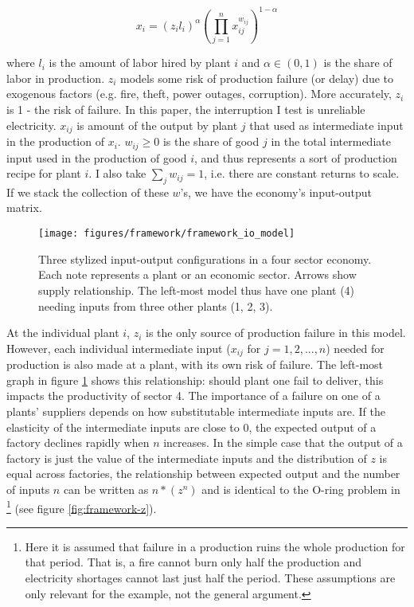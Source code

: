 \documentclass[11pt]{article}
\begin{document}
\[
x_i =  (z_i l_i)^{\alpha}(\prod^{n}_{j = 1} x_{ij}^{w_{ij}})^{1 - \alpha}
\]

where \(l_i\) is the amount of labor hired by plant \(i\) and \(\alpha \in (0, 1)\) is the share of labor in production. \(z_i\) models some risk of production failure (or delay) due to exogenous factors (e.g. fire, theft, power outages, corruption). More accurately, \(z_i\) is 1 - the risk of failure. In this paper, the interruption I test is unreliable electricity. \(x_{ij}\) is amount of the output by plant \(j\) that used as intermediate input in the production of \(x_i\). \(w_{ij} \geq 0\) is the share of good \(j\) in the total intermediate input used in the production of good \(i\), and thus represents a sort of production recipe for plant \(i\). I also take \(\sum_j w_{ij} = 1\), i.e. there are constant returns to scale. If we stack the collection of  these \(w\)'s, we have the economy's input-output matrix.

\begin{figure}[htpb]
	\centering
	\texttt{[image: figures/framework/framework\_io\_model]}
	\caption{Three stylized input-output configurations in a four sector economy. Each note represents a plant or an economic sector. Arrows show supply relationship. The left-most model thus have one plant (4) needing inputs from three other plants (1, 2, 3).}%
	\label{fig:framework-io-model}
\end{figure}

At the individual plant \(i\), \(z_i\) is the only source of production failure in this model. However, each individual intermediate input (\(x_{ij}\) for \(j = 1, 2, ..., n\)) needed for production is also made at a plant, with its own risk of failure. The left-most graph in figure \ref{fig:framework-io-model} shows this relationship: should plant one fail to deliver, this impacts the productivity of sector 4. The importance of a failure on one of a plants' suppliers depends on how substitutable intermediate inputs are. If the elasticity of the intermediate inputs are close to 0, the expected output of a factory declines rapidly when \(n\) increases. In the simple case that the output of a factory is just the value of the intermediate inputs and the distribution of \(z\) is equal across factories, the relationship between expected output and the number of inputs \(n\) can be written as \(n*(z^{n})\) and is identical to the O-ring problem in \cite{kremer_o-ring_1993}\footnote{Here it is assumed that failure in a production ruins the whole production for that period. That is, a fire cannot burn only half the production and electricity shortages cannot last just half the period. These assumptions are only relevant for the example, not the general argument.} (see figure \ref{fig:framework-z}).
\end{document}
